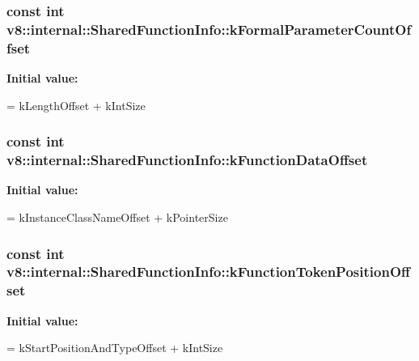 \subsubsection[{k\+Formal\+Parameter\+Count\+Offset}]{\setlength{\rightskip}{0pt plus 5cm}const int v8\+::internal\+::\+Shared\+Function\+Info\+::k\+Formal\+Parameter\+Count\+Offset\hspace{0.3cm}{\ttfamily [static]}}\label{classv8_1_1internal_1_1_shared_function_info_a37ac8977c943f1a1a385267bfdd6ea12}
{\bfseries Initial value\+:}
\begin{DoxyCode}
=
      kLengthOffset + kIntSize
\end{DoxyCode}
\hypertarget{classv8_1_1internal_1_1_shared_function_info_aca3c804b0ee9fb8a7aa9de2f239aedc7}{}
\subsubsection[{k\+Function\+Data\+Offset}]{\setlength{\rightskip}{0pt plus 5cm}const int v8\+::internal\+::\+Shared\+Function\+Info\+::k\+Function\+Data\+Offset\hspace{0.3cm}{\ttfamily [static]}}\label{classv8_1_1internal_1_1_shared_function_info_aca3c804b0ee9fb8a7aa9de2f239aedc7}
{\bfseries Initial value\+:}
\begin{DoxyCode}
=
      kInstanceClassNameOffset + kPointerSize
\end{DoxyCode}
\hypertarget{classv8_1_1internal_1_1_shared_function_info_a65fbece968652f2fe5e2e009dfe4531d}{}
\subsubsection[{k\+Function\+Token\+Position\+Offset}]{\setlength{\rightskip}{0pt plus 5cm}const int v8\+::internal\+::\+Shared\+Function\+Info\+::k\+Function\+Token\+Position\+Offset\hspace{0.3cm}{\ttfamily [static]}}\label{classv8_1_1internal_1_1_shared_function_info_a65fbece968652f2fe5e2e009dfe4531d}
{\bfseries Initial value\+:}
\begin{DoxyCode}
=
      kStartPositionAndTypeOffset + kIntSize
\end{DoxyCode}
\hypertarget{classv8_1_1internal_1_1_shared_function_info_a8157b1da28ec80de7d2881c7b888c9fe}{}
